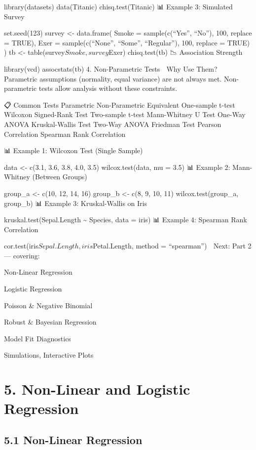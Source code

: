 \documentclass[
  letterpaper,
  DIV=11,
  numbers=noendperiod]{scrreprt}
\begin{document}
library(datasets) data(Titanic) chisq.test(Titanic) 📊 Example 3:
Simulated Survey

set.seed(123) survey \textless- data.frame( Smoke = sample(c(``Yes'',
``No''), 100, replace = TRUE), Exer = sample(c(``None'', ``Some'',
``Regular''), 100, replace = TRUE) ) tb \textless-
table(survey\(Smoke, survey\)Exer) chisq.test(tb) 📉 Association
Strength

library(vcd) assocstats(tb) 4. Non-Parametric Tests 🎯 Why Use Them?
Parametric assumptions (normality, equal variance) are not always met.
Non-parametric tests allow analysis without these constraints.

📋 Common Tests Parametric Non-Parametric Equivalent One-sample t-test
Wilcoxon Signed-Rank Test Two-sample t-test Mann-Whitney U Test One-Way
ANOVA Kruskal-Wallis Test Two-Way ANOVA Friedman Test Pearson
Correlation Spearman Rank Correlation

📊 Example 1: Wilcoxon Test (Single Sample)

data \textless- c(3.1, 3.6, 3.8, 4.0, 3.5) wilcox.test(data, mu = 3.5)
📊 Example 2: Mann-Whitney (Between Groups)

group\_a \textless- c(10, 12, 14, 16) group\_b \textless- c(8, 9, 10,
11) wilcox.test(group\_a, group\_b) 📊 Example 3: Kruskal-Wallis on Iris

kruskal.test(Sepal.Length \textasciitilde{} Species, data = iris) 📊
Example 4: Spearman Rank Correlation

cor.test(iris\(Sepal.Length, iris\)Petal.Length, method = ``spearman'')
🚧 Next: Part 2 --- covering:

Non-Linear Regression

Logistic Regression

Poisson \& Negative Binomial

Robust \& Bayesian Regression

Model Fit Diagnostics

Simulations, Interactive Plots

\section{5. Non-Linear and Logistic
Regression}\label{non-linear-and-logistic-regression}

\subsection{5.1 Non-Linear Regression}\label{non-linear-regression}
\end{document}
